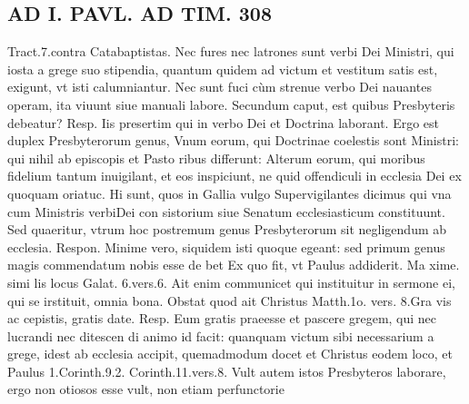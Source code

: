 \documentclass{article}
\begin{document}
\begin{pages}
\section*{AD I. PAVL. AD TIM. 308 }
\marginpar{[ p.]}\pstart Tract.7.contra Catabaptistas. Nec fures nec latrones sunt verbi Dei Ministri, qui iosta a grege suo stipendia, quantum quidem ad victum et vestitum satis est, exigunt, vt isti calumniantur. Nec sunt fuci cùm strenue verbo Dei nauantes operam, ita viuunt siue manuali labore.  \pend\pstart Secundum caput, est quibus Presbyteris debeatur? Resp. Iis presertim qui in verbo Dei et Doctrina laborant. Ergo est duplex Presbyterorum genus, Vnum eorum, qui Doctrinae coelestis sont Ministri: qui nihil ab episcopis et Pasto ribus differunt: Alterum eorum, qui moribus fidelium tantum inuigilant, et eos inspiciunt, ne quid offendiculi in ecclesia Dei ex quoquam oriatuc. Hi sunt, quos in Gallia vulgo Supervigilantes dicimus qui vna cum Ministris verbiDei con sistorium siue Senatum ecclesiasticum constituunt. Sed quaeritur, vtrum hoc postremum genus Presbyterorum sit negligendum ab ecclesia. Respon. Minime vero, siquidem isti quoque egeant: sed primum genus magis commendatum nobis esse de bet Ex quo fit, vt Paulus addiderit. Ma xime. simi lis locus Galat. 6.vers.6. Ait enim communicet qui instituitur in sermone ei, qui se irstituit, omnia bona. Obstat quod ait Christus Matth.1o. vers. 8.Gra vis ac cepistis, gratis date. Resp. Eum gratis praeesse et pascere gregem, qui nec lucrandi nec ditescen di animo id facit: quanquam victum sibi necessarium a grege, idest ab ecclesia accipit, quemadmodum docet et Christus eodem loco, et Paulus 1.Corinth.9.2. Corinth.11.vers.8.  \pend\pstart Vult autem istos Presbyteros laborare, ergo non otiosos esse vult, non etiam perfunctorie  \pend

\end{pages}
\end{document}
